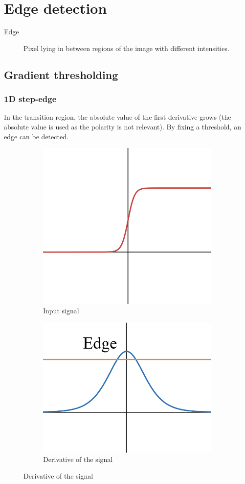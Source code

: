 \chapter{Edge detection}


\begin{description}
    \item[Edge] 
        Pixel lying in between regions of the image with different intensities.
\end{description}



\section{Gradient thresholding}

\subsection{1D step-edge}

In the transition region, the absolute value of the first derivative grows (the absolute value is used as the polarity is not relevant).
By fixing a threshold, an edge can be detected.

\begin{figure}[H]
    \begin{subfigure}{0.4\linewidth}
        \centering
        \includegraphics[width=0.5\linewidth]{./img/1d_step_edge_example1.png}
        \caption{Input signal}
    \end{subfigure}
    \begin{subfigure}{0.4\linewidth}
        \centering
        \includegraphics[width=0.5\linewidth]{./img/1d_step_edge_example2.png}
        \caption{Derivative of the signal}
    \end{subfigure}
\end{figure}


